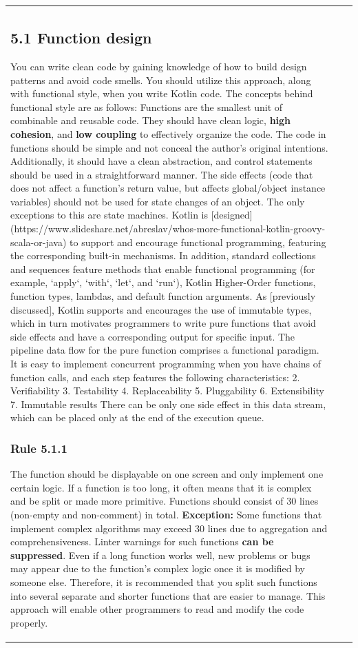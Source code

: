 \begin{center}
\begin{tabular}{ |p{}|p{}|p{}| }
{{{{{\subsection*{\textbf{5.1 Function design}}
You can write clean code by gaining knowledge of how to build design patterns and avoid code smells.
You should utilize this approach, along with functional style, when you write Kotlin code.
The concepts behind functional style are as follows:
Functions are the smallest unit of combinable and reusable code.
They should have clean logic, \textbf{high cohesion}, and \textbf{low coupling} to effectively organize the code.
The code in functions should be simple and not conceal the author's original intentions.
Additionally, it should have a clean abstraction, and control statements should be used in a straightforward manner.
The side effects (code that does not affect a function's return value, but affects global/object instance variables) should not be used for state changes of an object.
The only exceptions to this are state machines.
Kotlin is [designed](https://www.slideshare.net/abreslav/whos-more-functional-kotlin-groovy-scala-or-java) to support and encourage functional programming, featuring the corresponding built-in mechanisms.
In addition, standard collections and sequences feature methods that enable functional programming (for example, `apply`, `with`, `let`, and `run`), Kotlin Higher-Order functions, function types, lambdas, and default function arguments.
As [previously discussed], Kotlin supports and encourages the use of immutable types, which in turn motivates programmers to write pure functions that avoid side effects and have a corresponding output for specific input.
The pipeline data flow for the pure function comprises a functional paradigm. It is easy to implement concurrent programming when you have chains of function calls, and each step features the following characteristics:
2.	Verifiability
3.	Testability
4.	Replaceability
5.	Pluggability
6.	Extensibility
7.	Immutable results
There can be only one side effect in this data stream, which can be placed only at the end of the execution queue.
\subsubsection*{\textbf{Rule 5.1.1}}
The function should be displayable on one screen and only implement one certain logic.
If a function is too long, it often means that it is complex and be split or made more primitive. Functions should consist of 30 lines (non-empty and non-comment) in total.
\textbf{Exception:} Some functions that implement complex algorithms may exceed 30 lines due to aggregation and comprehensiveness.
Linter warnings for such functions \textbf{can be suppressed}.
Even if a long function works well, new problems or bugs may appear due to the function's complex logic once it is modified by someone else.
Therefore, it is recommended that you split such functions into several separate and shorter functions that are easier to manage.
This approach will enable other programmers to read and modify the code properly.
}}}}}
\end{tabular}
\end{center}
